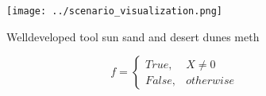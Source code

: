 \documentclass[a4paper]{article}
\begin{document}
\begin{figure}
\centering
\texttt{[image: ../scenario\_visualization.png]}
\caption{Welldeveloped tool sun sand and desert dunes meth
}
\end{figure}
 
\begin{equation}   f =
\begin{cases} True, & X \neq 0\\
False, & otherwise
\end{cases}
\end{equation}
\end{document}
